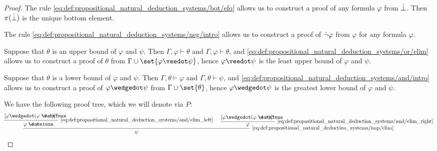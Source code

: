 \begin{proof}
   The rule \eqref{eq:def:propositional_natural_deduction_systems/bot/efq} allows us to construct a proof of any formula \( \varphi \) from \( \dot\bot \). Then \( \pi(\dot\bot) \) is the unique bottom element.

   The rule \eqref{eq:def:propositional_natural_deduction_systems/neg/intro} allows us to construct a proof of \( \dot\neg \varphi \) from \( \varphi \) for any formula \( \varphi \).

   Suppose that \( \theta \) is an upper bound of \( \varphi \) and \( \psi \). Then \( \Gamma, \varphi \vdash \theta \) and \( \Gamma, \varphi \vdash \theta \), and \ref{eq:def:propositional_natural_deduction_systems/or/elim} allows us to construct a proof of \( \theta \) from \( \Gamma \cup \set{ \varphi \synvee \psi } \), hence \( \varphi \synvee \psi \) is the least upper bound of \( \varphi \) and \( \psi \).

   Suppose that \( \theta \) is a lower bound of \( \varphi \) and \( \psi \). Then \( \Gamma, \theta \vdash \varphi \) and \( \Gamma, \theta \vdash \psi \), and \ref{eq:def:propositional_natural_deduction_systems/and/intro} allows us to construct a proof of \( \varphi \synwedge \psi \) from \( \Gamma \cup \set{ \theta } \), hence \( \varphi \synwedge \psi \) is the greatest lower bound of \( \varphi \) and \( \psi \).



  We have the following proof tree, which we will denote via \( P \):
  \begin{equation*}
    \begin{prooftree}
      \hypo{ [\varphi \synwedge (\varphi \synimplies \psi)]^u }
      \infer1[\ref{eq:def:propositional_natural_deduction_systems/and/elim_left}]{ \varphi \synimplies \psi }

      \hypo{ [\varphi \synwedge (\varphi \synimplies \psi)]^u }
      \infer1[\ref{eq:def:propositional_natural_deduction_systems/and/elim_right}]{ \varphi }

      \infer2[\ref{eq:def:propositional_natural_deduction_systems/imp/elim}]{ \psi }
    \end{prooftree}
  \end{equation*}


\end{proof}
